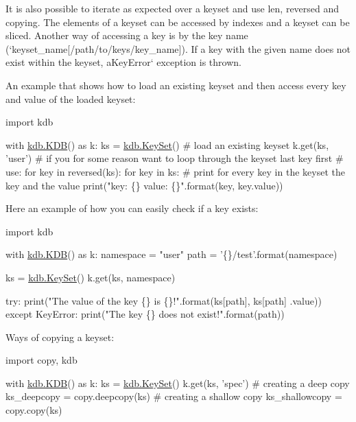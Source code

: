 It is also possible to iterate as expected over a keyset and use {\ttfamily len}, {\ttfamily reversed} and copying. The elements of a keyset can be accessed by indexes and a keyset can be sliced. Another way of accessing a key is by the key name (`keyset\+\_\+name\mbox{[}\textquotesingle{}/path/to/keys/key\+\_\+name\textquotesingle{}\mbox{]}{\ttfamily ). If a key with the given name does not exist within the keyset, a}Key\+Error` exception is thrown.

An example that shows how to load an existing keyset and then access every key and value of the loaded keyset\+:


\begin{DoxyCode}
\textcolor{keyword}{import} kdb

with \hyperlink{classkdb_1_1KDB}{kdb.KDB}() \textcolor{keyword}{as} k:
    ks = \hyperlink{classkdb_1_1KeySet}{kdb.KeySet}()
    \textcolor{comment}{# load an existing keyset}
    k.get(ks, \textcolor{stringliteral}{'user'})
    \textcolor{comment}{# if you for some reason want to loop through the keyset last key first}
    \textcolor{comment}{# use: for key in reversed(ks):}
    \textcolor{keywordflow}{for} key \textcolor{keywordflow}{in} ks:
        \textcolor{comment}{# print for every key in the keyset the key and the value}
        print(\textcolor{stringliteral}{"key: \{\} value: \{\}"}.format(key, key.value))
\end{DoxyCode}


Here an example of how you can easily check if a key exists\+:


\begin{DoxyCode}
\textcolor{keyword}{import} kdb

with \hyperlink{classkdb_1_1KDB}{kdb.KDB}() \textcolor{keyword}{as} k:
    namespace = \textcolor{stringliteral}{"user"}
    path = \textcolor{stringliteral}{'\{\}/test'}.format(namespace)

    ks = \hyperlink{classkdb_1_1KeySet}{kdb.KeySet}()
    k.get(ks, namespace)

    \textcolor{keywordflow}{try}:
        print(\textcolor{stringliteral}{"The value of the key \{\} is \{\}!"}.format(ks[path], ks[path]
                                                      .value))
    \textcolor{keywordflow}{except} KeyError:
        print(\textcolor{stringliteral}{"The key \{\} does not exist!"}.format(path))
\end{DoxyCode}


Ways of copying a keyset\+:


\begin{DoxyCode}
\textcolor{keyword}{import} copy, kdb

with \hyperlink{classkdb_1_1KDB}{kdb.KDB}() \textcolor{keyword}{as} k:
    ks = \hyperlink{classkdb_1_1KeySet}{kdb.KeySet}()
    k.get(ks, \textcolor{stringliteral}{'spec'})
    \textcolor{comment}{# creating a deep copy}
    ks\_deepcopy = copy.deepcopy(ks)
    \textcolor{comment}{# creating a shallow copy}
    ks\_shallowcopy = copy.copy(ks)
\end{DoxyCode}


